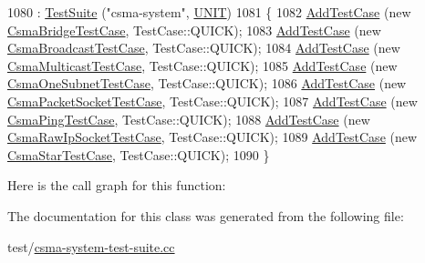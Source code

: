 \begin{DoxyCode}
1080   : \hyperlink{classns3_1_1TestSuite_a904b0c40583b744d30908aeb94636d1a}{TestSuite} (\textcolor{stringliteral}{"csma-system"}, \hyperlink{classns3_1_1TestSuite_a1ebfcab34ec8161e085e8e3a1855eae0a3885375a3787abf60431f8454b3cadbd}{UNIT})
1081 \{
1082   \hyperlink{classns3_1_1TestCase_a3718088e3eefd5d6454569d2e0ddd835}{AddTestCase} (\textcolor{keyword}{new} \hyperlink{classCsmaBridgeTestCase}{CsmaBridgeTestCase}, TestCase::QUICK);
1083   \hyperlink{classns3_1_1TestCase_a3718088e3eefd5d6454569d2e0ddd835}{AddTestCase} (\textcolor{keyword}{new} \hyperlink{classCsmaBroadcastTestCase}{CsmaBroadcastTestCase}, TestCase::QUICK);
1084   \hyperlink{classns3_1_1TestCase_a3718088e3eefd5d6454569d2e0ddd835}{AddTestCase} (\textcolor{keyword}{new} \hyperlink{classCsmaMulticastTestCase}{CsmaMulticastTestCase}, TestCase::QUICK);
1085   \hyperlink{classns3_1_1TestCase_a3718088e3eefd5d6454569d2e0ddd835}{AddTestCase} (\textcolor{keyword}{new} \hyperlink{classCsmaOneSubnetTestCase}{CsmaOneSubnetTestCase}, TestCase::QUICK);
1086   \hyperlink{classns3_1_1TestCase_a3718088e3eefd5d6454569d2e0ddd835}{AddTestCase} (\textcolor{keyword}{new} \hyperlink{classCsmaPacketSocketTestCase}{CsmaPacketSocketTestCase}, TestCase::QUICK);
1087   \hyperlink{classns3_1_1TestCase_a3718088e3eefd5d6454569d2e0ddd835}{AddTestCase} (\textcolor{keyword}{new} \hyperlink{classCsmaPingTestCase}{CsmaPingTestCase}, TestCase::QUICK);
1088   \hyperlink{classns3_1_1TestCase_a3718088e3eefd5d6454569d2e0ddd835}{AddTestCase} (\textcolor{keyword}{new} \hyperlink{classCsmaRawIpSocketTestCase}{CsmaRawIpSocketTestCase}, TestCase::QUICK);
1089   \hyperlink{classns3_1_1TestCase_a3718088e3eefd5d6454569d2e0ddd835}{AddTestCase} (\textcolor{keyword}{new} \hyperlink{classCsmaStarTestCase}{CsmaStarTestCase}, TestCase::QUICK);
1090 \}
\end{DoxyCode}


Here is the call graph for this function\+:




The documentation for this class was generated from the following file\+:\begin{DoxyCompactItemize}
\item 
test/\hyperlink{csma-system-test-suite_8cc}{csma-\/system-\/test-\/suite.\+cc}\end{DoxyCompactItemize}
